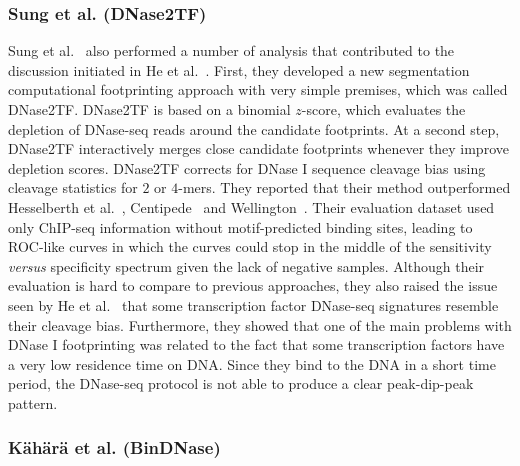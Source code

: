 \subsubsection{Sung et al. (DNase2TF)}
\label{sec:sung.2}

Sung et al.~\cite{sung2014} also performed a number of analysis that contributed to the discussion initiated in He et al.~\cite{he2014}. First, they developed a new segmentation computational footprinting approach with very simple premises, which was called DNase2TF. DNase2TF is based on a binomial $z$-score, which evaluates the depletion of DNase-seq reads around the candidate footprints. At a second step, DNase2TF interactively merges close candidate footprints whenever they improve depletion scores. DNase2TF corrects for DNase I sequence cleavage bias using cleavage statistics for $2$ or $4$-mers. They reported that their method outperformed Hesselberth et al.~\cite{hesselberth2009}, Centipede~\cite{pique2011} and Wellington~\cite{piper2013}. Their evaluation dataset used only ChIP-seq information without motif-predicted binding sites, leading to ROC-like curves in which the curves could stop in the middle of the sensitivity \emph{versus} specificity spectrum given the lack of negative samples. Although their evaluation is hard to compare to previous approaches, they also raised the issue seen by He et al.~\cite{he2014} that some transcription factor DNase-seq signatures resemble their cleavage bias. Furthermore, they showed that one of the main problems with DNase I footprinting was related to the fact that some transcription factors have a very low residence time on DNA. Since they bind to the DNA in a short time period, the DNase-seq protocol is not able to produce a clear peak-dip-peak pattern.

\subsubsection{K\"{a}h\"{a}r\"{a} et al. (BinDNase)}
\label{sec:kahara.2}

